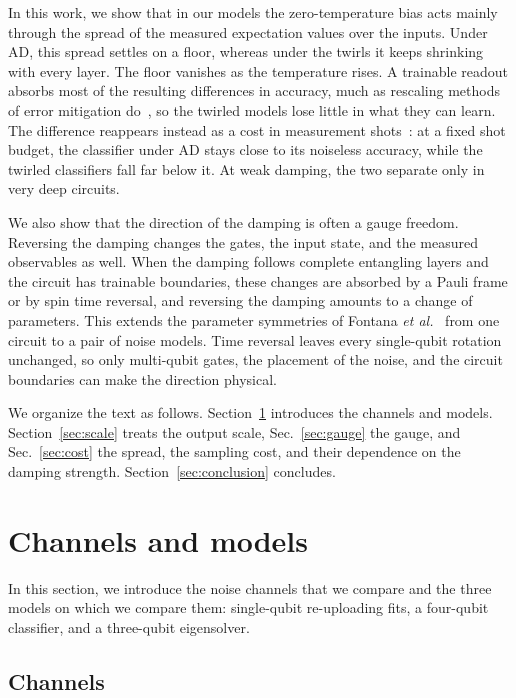 \documentclass[
 aps,pra,
 twocolumn,
 superscriptaddress,
 longbibliography,
 nofootinbib
]{revtex4-2}
\begin{document}
In this work, we show that in our models the zero-temperature bias acts mainly
through the spread of the measured expectation values over the inputs. Under
AD, this spread settles on a floor, whereas under the twirls it keeps shrinking
with every layer. The floor vanishes as the temperature rises. A trainable
readout absorbs most of the resulting differences in accuracy, much as
rescaling methods of error mitigation do~\cite{vovrosh2021simple}, so the
twirled models lose little in what they can learn. The difference reappears
instead as a cost in measurement shots~\cite{wang2024errormitigation}: at a
fixed shot budget, the classifier under AD stays close to its noiseless
accuracy, while the twirled classifiers fall far below it. At weak damping, the
two separate only in very deep circuits.

We also show that the direction of the damping is often a gauge freedom.
Reversing the damping changes the gates, the input state, and the measured
observables as well. When the damping follows complete entangling layers and
the circuit has trainable boundaries, these changes are absorbed by a Pauli
frame or by spin time reversal, and reversing the damping
amounts to a change of parameters. This extends the parameter symmetries of Fontana
\textit{et al.}~\cite{fontana2022nontrivial} from one circuit to a pair of
noise models. Time reversal leaves every single-qubit rotation unchanged, so
only multi-qubit gates, the placement of the noise, and the circuit boundaries
can make the direction physical.

We organize the text as follows. Section~\ref{sec:setting} introduces the
channels and models. Section~\ref{sec:scale} treats the output scale,
Sec.~\ref{sec:gauge} the gauge, and Sec.~\ref{sec:cost} the spread, the
sampling cost, and their dependence on the damping strength.
Section~\ref{sec:conclusion} concludes.

\section{Channels and models}
\label{sec:setting}

In this section, we introduce the noise channels that we compare and the three
models on which we compare them: single-qubit re-uploading fits, a four-qubit
classifier, and a three-qubit eigensolver.

\subsection{Channels}
\label{sec:channels}
\end{document}
